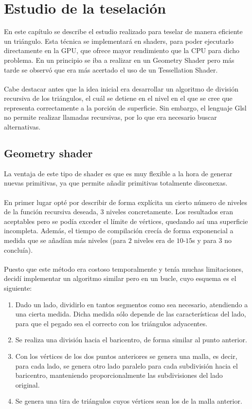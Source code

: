 
\chapter{Estudio de la teselación}

En este capítulo se describe el estudio realizado para teselar de manera eficiente un triángulo. Esta técnica se implementará en shaders, para poder ejecutarlo directamente en la GPU, que ofrece mayor rendimiento que la CPU para dicho problema. En un principio se iba a realizar en un Geometry Shader pero más tarde se observó que era más acertado el uso de un Tessellation Shader. \\
\\ Cabe destacar antes que la idea inicial era desarrollar un algoritmo de división recursiva de los triángulos, el cuál se detiene en el nivel en el que se cree que representa correctamente a la porción de superficie. Sin embargo, el lenguaje Glsl no permite realizar llamadas recursivas, por lo que era necesario buscar alternativas.

\section{Geometry shader}
	La ventaja de este tipo de shader es que es muy flexible a la hora de generar nuevas primitivas, ya que permite añadir primitivas totalmente disconexas.\\
	\\ En primer lugar opté por describir de forma explícita un cierto número de niveles de la función recursiva deseada, $3$ niveles concretamente. Los resultados eran aceptables pero se podía exceder el límite de vértices, quedando así una superficie incompleta. Además, el tiempo de compilación crecía de forma exponencial a medida que se añadían más niveles (para $2$ niveles era de $10$-$15$s y para $3$ no concluía).\\
	\\ Puesto que este método era costoso temporalmente y tenía muchas limitaciones, decidí implementar un algoritmo similar pero en un bucle, cuyo esquema es el siguiente:
	\begin{enumerate}
		\item Dado un lado, dividirlo en tantos segmentos como sea necesario, atendiendo a una cierta medida. Dicha medida sólo depende de las características del lado, para que el pegado sea el correcto con los triángulos adyacentes.
		\item Se realiza una división hacia el baricentro, de forma similar al punto anterior.
		\item Con los vértices de los dos puntos anteriores se genera una malla, es decir, para cada lado, se genera otro lado paralelo para cada subdivisión hacia el baricentro, manteniendo proporcionalmente las subdivisiones del lado original.
		\item Se genera una tira de triángulos cuyos vértices sean los de la malla anterior.
	\end{enumerate}
	
